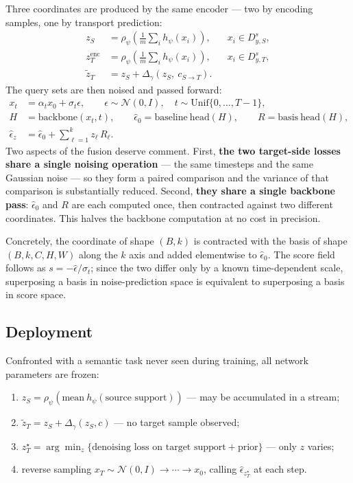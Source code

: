\documentclass[11pt]{article}
\newcommand{\epshat}{\hat{\epsilon}}
\newcommand{\zS}{z_{S}}
\newcommand{\zencT}{z^{\mathrm{enc}}_{T}}
\newcommand{\ztilT}{\tilde{z}_{T}}
\newcommand{\zstarT}{z^{\star}_{T}}
\newcommand{\Dss}{D^{s}_{y,S}}
\newcommand{\Dst}{D^{s}_{y,T}}
\begin{document}
Three coordinates are produced by the same encoder --- two by encoding samples, one by transport
prediction:
\begin{align}
\zS      &= \rho_\psi\!\left(\tfrac{1}{m}\textstyle\sum_{i} h_\psi(x_i)\right), && x_i\in\Dss, \\
\zencT   &= \rho_\psi\!\left(\tfrac{1}{m}\textstyle\sum_{i} h_\psi(x_i)\right), && x_i\in\Dst, \\
\ztilT   &= \zS + \Delta_\gamma\!\left(\zS,\ c_{S\to T}\right). &&
\end{align}
The query sets are then noised and passed forward:
\begin{align}
x_t &= \alpha_t x_0 + \sigma_t \epsilon, \qquad \epsilon\sim\mathcal{N}(0,I),\quad t\sim\mathrm{Unif}\{0,\dots,T-1\},\\
H &= \mathrm{backbone}(x_t,t),\qquad \epshat_0 = \mathrm{baseline\ head}(H),\qquad R = \mathrm{basis\ head}(H),\\
\epshat_{z} &= \epshat_0 + \textstyle\sum_{\ell=1}^{k} z_\ell\,R_\ell .
\label{eq:fuse}
\end{align}
Two aspects of the fusion deserve comment. First, \textbf{the two target-side losses share a single
noising operation} --- the same timesteps and the same Gaussian noise --- so they form a paired
comparison and the variance of that comparison is substantially reduced. Second, \textbf{they share
a single backbone pass}: $\epshat_0$ and $R$ are each computed once, then contracted against two
different coordinates. This halves the backbone computation at no cost in precision.

\begin{sloppypar}
Concretely, the coordinate of shape $(B,k)$ is contracted with the basis of shape
$(B,k,C,H,W)$ along the $k$ axis and added elementwise to $\epshat_0$. The score field follows as
$s=-\epshat/\sigma_t$; since the two differ only by a known time-dependent scale, superposing a
basis in noise-prediction space is equivalent to superposing a basis in score space.
\end{sloppypar}

\subsection{Deployment}

Confronted with a semantic task never seen during training, all network parameters are frozen:
\begin{enumerate}[leftmargin=2.2em, itemsep=2pt]
  \item $\zS=\rho_\psi\!\left(\mathrm{mean}\ h_\psi(\text{source support})\right)$ --- may be
        accumulated in a stream;
  \item $\ztilT=\zS+\Delta_\gamma(\zS,c)$ --- no target sample observed;
  \item $\zstarT=\arg\min_z\{\text{denoising loss on target support}+\text{prior}\}$ --- only $z$ varies;
  \item reverse sampling $x_T\sim\mathcal{N}(0,I)\to\cdots\to x_0$, calling $\epshat_{\zstarT}$ at each step.
\end{enumerate}
\end{document}
